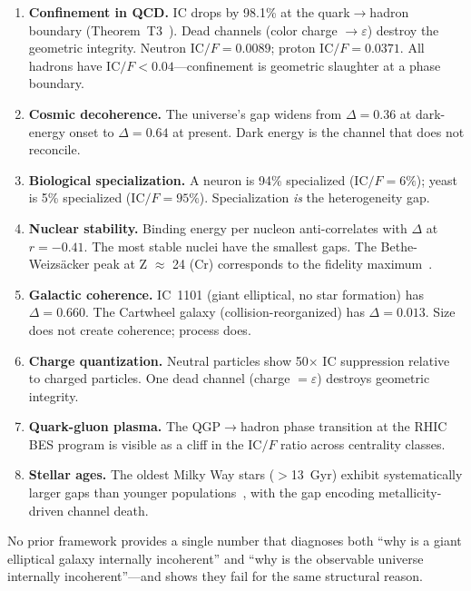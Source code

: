 \documentclass[
  aps,
  prd,
  twocolumn,
  superscriptaddress,
  nofootinbib,
  floatfix
]{revtex4-2}
\newcommand{\eps}{\varepsilon}
\newcommand{\IC}{\mathrm{IC}}
\begin{document}
\begin{enumerate}[leftmargin=*,label=(\roman*)]
\item \textbf{Confinement in QCD.}  $\IC$ drops by 98.1\% at the
  quark$\to$hadron boundary (Theorem~T3~\cite{paulus2026sm}).  Dead
  channels (color charge $\to \eps$) destroy the geometric integrity.
  Neutron $\IC/F = 0.0089$; proton $\IC/F = 0.0371$.  All hadrons
  have $\IC/F < 0.04$---confinement is geometric slaughter at a
  phase boundary.

\item \textbf{Cosmic decoherence.}  The universe's gap widens from
  $\Delta = 0.36$ at dark-energy onset to $\Delta = 0.64$ at present.
  Dark energy is the channel that does not reconcile.

\item \textbf{Biological specialization.}  A neuron is 94\%
  specialized ($\IC/F = 6\%$); yeast is 5\% specialized
  ($\IC/F = 95\%$).  Specialization \emph{is} the heterogeneity gap.

\item \textbf{Nuclear stability.}  Binding energy per nucleon
  anti-correlates with $\Delta$ at $r = -0.41$.  The most stable
  nuclei have the smallest gaps.  The Bethe-Weizs\"acker peak
  at Z $\approx$ 24 (Cr) corresponds to the fidelity
  maximum~\cite{paulus2026sm}.

\item \textbf{Galactic coherence.}  IC~1101 (giant elliptical, no
  star formation) has $\Delta = 0.660$.  The Cartwheel galaxy
  (collision-reorganized) has $\Delta = 0.013$.  Size does not create
  coherence; process does.

\item \textbf{Charge quantization.}  Neutral particles show
  50$\times$ $\IC$ suppression relative to charged particles.  One
  dead channel (charge $= \eps$) destroys geometric integrity.

\item \textbf{Quark-gluon plasma.}  The QGP$\to$hadron phase
  transition at the RHIC BES program is visible as a cliff in the
  $\IC/F$ ratio across centrality classes.

\item \textbf{Stellar ages.}  The oldest Milky Way stars ($>$13~Gyr)
  exhibit systematically larger gaps than younger
  populations~\cite{tomasetti2026stellar}, with the gap encoding
  metallicity-driven channel death.
\end{enumerate}

No prior framework provides a single number that diagnoses both
``why is a giant elliptical galaxy internally incoherent'' and ``why
is the observable universe internally incoherent''---and shows they
fail for the same structural reason.
\end{document}
